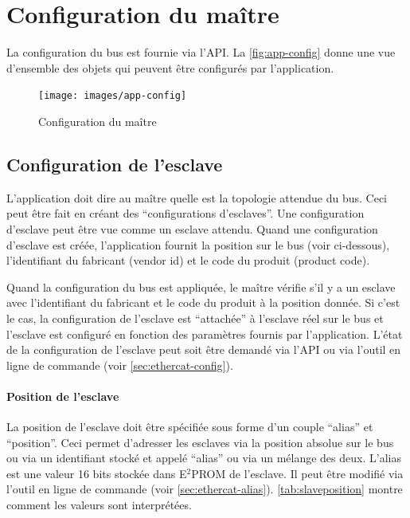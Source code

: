 \documentclass[a4paper,12pt,BCOR6mm,bibtotoc,idxtotoc]{scrbook}
\begin{document}
\section{Configuration du ma\^itre}
\label{sec:masterconfig}

La configuration du bus est fournie via l'API. La
\autoref{fig:app-config} donne une vue d'ensemble des objets qui
peuvent \^etre configur\'es par l'application.

\begin{figure}[htbp]
  \centering
  \texttt{[image: images/app-config]}
  \caption{Configuration du ma\^itre}
  \label{fig:app-config}
\end{figure}

\subsection{Configuration de l'esclave}

L'application doit dire au ma\^itre quelle est la topologie attendue
du bus.  Ceci peut \^etre fait en cr\'eant des ``configurations
d'esclaves''.  Une configuration d'esclave peut \^etre vue comme un
esclave attendu.  Quand une configuration d'esclave est cr\'e\'ee,
l'application fournit la position sur le bus (voir ci-dessous),
l'identifiant du fabricant (vendor id) et le code du produit (product
code).

Quand la configuration du bus est appliqu\'ee, le ma\^itre v\'erifie
s'il y a un esclave avec l'identifiant du fabricant et le code du
produit \`a la position donn\'ee.  Si c'est le cas, la configuration
de l'esclave est ``attach\'ee'' \`a l'esclave r\'eel sur le bus et
l'esclave est configur\'e en fonction des param\`etres fournis par
l'application.  L'\'etat de la configuration de l'esclave peut soit
\^etre demand\'e via l'API ou via l'outil en ligne de commande (voir
\autoref{sec:ethercat-config}).

\paragraph{Position de l'esclave} La position de l'esclave doit \^etre
sp\'ecifi\'ee sous forme d'un couple ``alias'' et ``position''.  Ceci
permet d'adresser les esclaves via la position absolue sur le bus ou
via un identifiant stock\'e et appel\'e ``alias'' ou via un m\'elange
des deux.  L'alias est une valeur 16 bits stock\'ee dans E$^2$PROM de
l'esclave.  Il peut \^etre modifi\'e via l'outil en ligne de commande
(voir \autoref{sec:ethercat-alias}).  \autoref{tab:slaveposition}
montre comment les valeurs sont interpr\'et\'ees.
\end{document}
